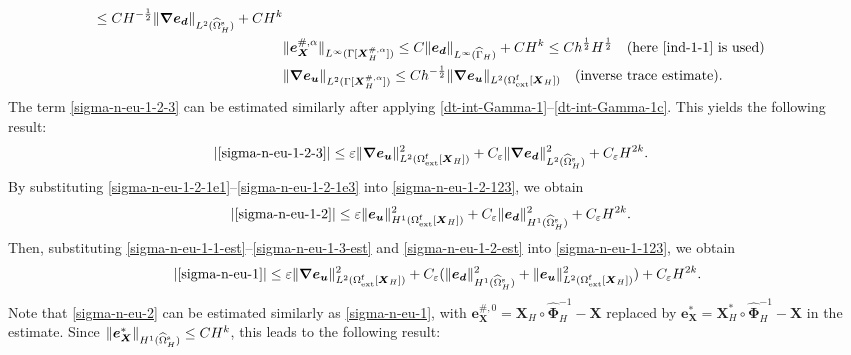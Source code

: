 \documentclass[11pt,reqno]{amsart}
\theoremstyle{definition}
\theoremstyle{plain}
\numberwithin{theorem}{section}
\numberwithin{proposition}{section}
\numberwithin{lemma}{section}
\numberwithin{equation}{section}
\newcommand{\bs}[1]{\boldsymbol{#1}}
\newcommand{\uu}[1]  {{\bs{#1}} }
\newcommand{\dep}{{{\bs{d}}}}
\newcommand{\grad}   { \uu{\nabla}    }
\renewcommand{\(}{\bigl(}
\renewcommand{\)}{\bigr)}
\begin{document}
\begin{itemize}[leftmargin=20pt]
\begin{align*}
\le CH^{-\frac12}\|\grad {\bs e}_{\bs d}\|_{L^2(\widehat{\Omega}^{\rm s}_H)} + CH^k \\
&\| {\bs e}_{\bs X}^{\#,\alpha}\|_{L^\infty(\Gamma[{\bs X}_H^{\#,\alpha}])} \le C\| {\bs e}_{\bs d}\|_{L^\infty(\widehat\Gamma_H)} + CH^k \le Ch^{\frac12}H^{\frac12} \quad\mbox{(here \eqref{ind-1-1} is used)}\\
&\|\grad {\bs e}_{\bs u} \|_{L^2(\Gamma[{\bs X}_H^{\#,\alpha}])} 
\le Ch^{-\frac12}\|\grad {\bs e}_{\bs u} \|_{L^2(\Omega^{\rm f}_{\rm ext}[{\bs X}_H])} \quad\mbox{(inverse trace estimate)} . 
\end{align*} 
The term \eqref{sigma-n-eu-1-2-3} can be estimated similarly after applying \eqref{dt-int-Gamma-1}--\eqref{dt-int-Gamma-1c}. This yields the following result: 
\begin{align}\label{sigma-n-eu-1-2-1e3}
|\eqref{sigma-n-eu-1-2-3}|
&\le 
\varepsilon\|\grad {\bs e}_{\bs u}\|_{L^2(\Omega^{\rm f}_{\rm ext}[{\bs X}_H])}^2 
+ C_{\varepsilon}  \|\grad {\bs e}_\dep \|_{L^2(\widehat{\Omega}^{\rm s}_H)}^2 + C_{\varepsilon} H^{2k} .
\end{align}
By substituting \eqref{sigma-n-eu-1-2-1e1}--\eqref{sigma-n-eu-1-2-1e3} into \eqref{sigma-n-eu-1-2-123}, we obtain 
\begin{align}\label{sigma-n-eu-1-2-est}
|\eqref{sigma-n-eu-1-2}|
&\le \varepsilon\|{\bs e}_{\bs u}\|_{H^1(\Omega^{\rm f}_{\rm ext}[{\bs X}_H])}^2 
+ C_{\varepsilon}  \|{\bs e}_\dep \|_{H^1(\widehat{\Omega}^{\rm s}_H)}^2 + C_{\varepsilon} H^{2k} .
\end{align}
Then, substituting \eqref{sigma-n-eu-1-1-est}--\eqref{sigma-n-eu-1-3-est} and \eqref{sigma-n-eu-1-2-est} into \eqref{sigma-n-eu-1-123}, we obtain 
\begin{align}\label{sigma-n-eu-1-f}
|\eqref{sigma-n-eu-1}| 
\le 
\varepsilon\|\grad {\bs e}_{\bs u}\|_{L^2(\Omega^{\rm f}_{\rm ext}[{\bs X}_H])}^2 
+ C_{\varepsilon} (\| {\bs e}_\dep \|_{H^1(\widehat{\Omega}^{\rm s}_H)}^2
+ \|{\bs e}_{\bs u} \|_{L^2(\Omega^{\rm f}_{\rm ext}[{\bs X}_H])}^2 ) + C_{\varepsilon} H^{2k} .
\end{align}
Note that \eqref{sigma-n-eu-2} can be estimated similarly as \eqref{sigma-n-eu-1}, with ${\bs e}_{\bs X}^{\#,0}= {\bs X}_H\circ \widehat{\bs\Phi}_H^{-1} - {\bs X}$ replaced by ${\bs e}_{\bs X}^*= {\bs X}_H^*\circ \widehat{\bs\Phi}_H^{-1} - {\bs X} $ in the estimate. Since $\|{\bs e}_{\bs X}^*\|_{H^1(\widehat{\Omega}^{\rm s}_H)}\le CH^k$, this leads to the following result: 
\begin{align}\label{sigma-n-eu-2-f}

\end{align}
\end{itemize}
\end{document}
